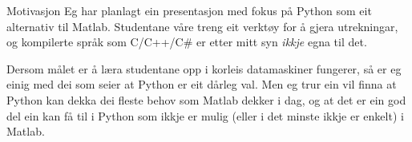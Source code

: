\begin{frame}{Motivasjon}
  Eg har planlagt ein presentasjon med fokus på Python som eit alternativ til Matlab. Studentane våre treng eit verktøy for å gjera utrekningar, og kompilerte språk som C/C++/C\# er etter mitt syn \textit{ikkje} egna til det.

  Dersom målet er å læra studentane opp i korleis datamaskiner fungerer, så er eg einig med dei som seier at Python er eit dårleg val. Men eg trur ein vil finna at Python kan dekka dei fleste behov som Matlab dekker i dag, og at det er ein god del ein kan få til i Python som ikkje er mulig (eller i det minste ikkje er enkelt) i Matlab.


  
\end{frame}
